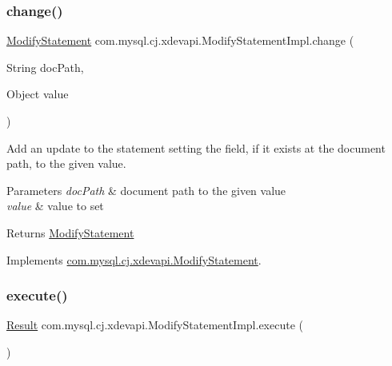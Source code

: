 \subsubsection{\texorpdfstring{change()}{change()}}
{\footnotesize\ttfamily \mbox{\hyperlink{interfacecom_1_1mysql_1_1cj_1_1xdevapi_1_1_modify_statement}{Modify\+Statement}} com.\+mysql.\+cj.\+xdevapi.\+Modify\+Statement\+Impl.\+change (\begin{DoxyParamCaption}\item[{String}]{doc\+Path,  }\item[{Object}]{value }\end{DoxyParamCaption})}

Add an update to the statement setting the field, if it exists at the document path, to the given value.


\begin{DoxyParams}{Parameters}
{\em doc\+Path} & document path to the given value \\
\hline
{\em value} & value to set \\
\hline
\end{DoxyParams}
\begin{DoxyReturn}{Returns}
\mbox{\hyperlink{interfacecom_1_1mysql_1_1cj_1_1xdevapi_1_1_modify_statement}{Modify\+Statement}} 
\end{DoxyReturn}


Implements \mbox{\hyperlink{interfacecom_1_1mysql_1_1cj_1_1xdevapi_1_1_modify_statement_acb3745c970e50cf538e8d9b2295a08e1}{com.\+mysql.\+cj.\+xdevapi.\+Modify\+Statement}}.

\mbox{\label{classcom_1_1mysql_1_1cj_1_1xdevapi_1_1_modify_statement_impl_aebce34d0e71257dc9bf3264a6dd0e6cd}} 
\subsubsection{\texorpdfstring{execute()}{execute()}}
{\footnotesize\ttfamily \mbox{\hyperlink{interfacecom_1_1mysql_1_1cj_1_1xdevapi_1_1_result}{Result}} com.\+mysql.\+cj.\+xdevapi.\+Modify\+Statement\+Impl.\+execute (\begin{DoxyParamCaption}{ }\end{DoxyParamCaption})}

